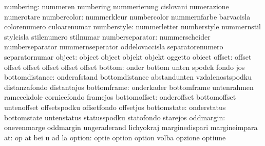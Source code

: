                 numbering: nummeren                  numbering
                           nummerierung              cislovani
                           numerazione               numerotare
              numbercolor: nummerkleur               numbercolor
                           nummernfarbe              barvacisla
                           colorenumero              culoarenumar
              numberstyle: nummerletter              numberstyle
                           nummernstil               stylcisla
                           stilenumero               stilnumar
          numberseparator: nummerscheider            numberseparator
                           nummernseperator          oddelovaccisla
                           separatorenumero          separatornumar
                   object: object                    object
                           objekt                    objekt
                           oggetto                   obiect
                   offset: offset                    offset
                           offset                    offset
                           offset                    offset
                   bottom: onder                     bottom
                           unten                     spodek
                           fondo                     jos
           bottomdistance: onderafstand              bottomdistance
                           abstandunten              vzdalenostspodku
                           distanzafondo             distantajos
              bottomframe: onderkader                bottomframe
                           untenrahmen               ramecekdole
                           cornicefondo              framejos
             bottomoffset: onderoffset               bottomoffset
                           untenoffset               offsetspodku
                           offsetfondo               offsetjos
              bottomstate: onderstatus               bottomstate
                           untenstatus               statusspodku
                           statofondo                starejos
                oddmargin: onevenmarge               oddmargin
                           ungeraderand              lichyokraj
                           marginedispari            margineimpara
                       at: op                        at
                           bei                       u
                           ad                        la
                   option: optie                     option
                           option                    volba
                           opzione                   optiune
